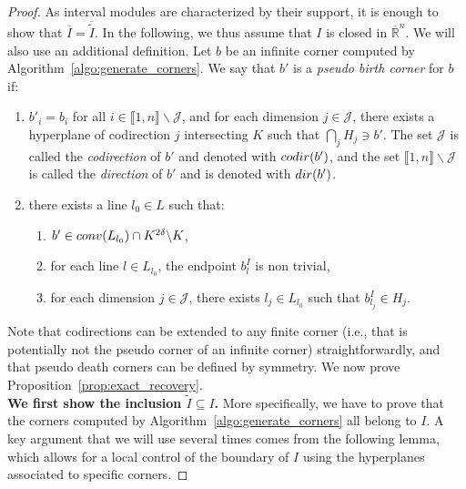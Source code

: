 \documentclass{article}
\newcommand{\conv}[1]{ {\rm conv}(#1) }
\newcommand{\dir}[1]{ {\rm dir}(#1) }
\newcommand{\codir}[1]{ {\rm codir}(#1) }
\newcommand{\R}{\mathbb{R}}
\begin{document}
\begin{proof}
	As interval modules are characterized by their support, it is enough to show that $ \overline{I} = \overline{\tilde I}$.
	In the following, we thus assume that $I$ is closed in $\overline{\R}^n$.
	We will also use an additional definition. Let $b$ be an infinite corner computed by Algorithm~\ref{algo:generate_corners}. We say that $b'$ is a \emph{pseudo birth corner} for $b$ if:
	\begin{enumerate}
		\item $b'_i=b_i$ for all $i\in\llbracket 1,n \rrbracket \backslash \mathcal J$,
			and for each
			dimension $j \in \mathcal J$, %
			there exists a hyperplane of codirection $j$ intersecting $K$ such that $\bigcap_j H_j \ni b'$.
			The set $\mathcal J$ is called the \emph{codirection} of $b'$ and denoted
			with $\codir{b'}$, and the set $\llbracket 1,n\rrbracket \backslash \mathcal J$ is called the {\em direction} of $b'$ and is denoted with $\dir{b'}$.
		\item there exists a line $l_0 \in L$ such that:
			\begin{enumerate}
				\item $b' \in \conv{L_{l_0}} \cap K^{2 \delta} \backslash K$,
				\item for each line $l \in L_{l_0}$, the endpoint $b_l^I$ is non trivial,
				\item for each dimension $j\in\mathcal J$, %
					there exists $l_j \in L_{l_0}$ such that $b_{l_j}^I\in H_j$.
			\end{enumerate}
	\end{enumerate}

	Note that codirections can be extended to any finite corner (i.e., that is
	potentially not the pseudo corner of an infinite corner) straightforwardly, and that pseudo death corners can be defined by symmetry.
	We now prove Proposition~\ref{prop:exact_recovery}. \\

	\textbf{We first show the inclusion ${\tilde I}\subseteq {I}$.} More specifically, we have to prove that the
	corners computed by Algorithm~\ref{algo:generate_corners}
	all belong to ${I}$. %
	A key argument that we will use several times comes from the following lemma,
	which allows for a local control of the boundary of ${I}$ using the hyperplanes associated to specific corners.


\end{proof}
\end{document}

